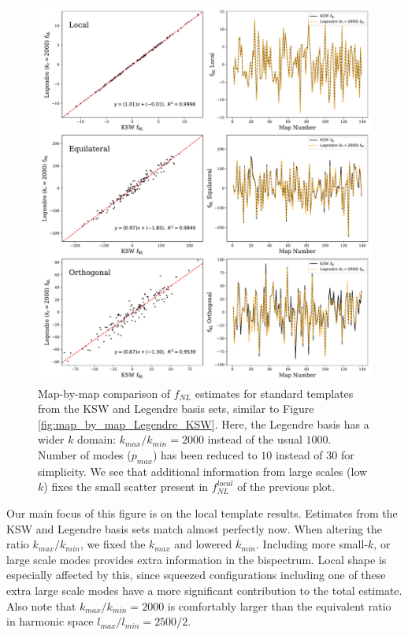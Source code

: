 \begin{figure}[htbp!] 
	\centering    
	\includegraphics[width=\textwidth]{map_by_map_Legendre_KSW_k_ratio_2000.pdf}
	\caption{Map-by-map comparison of $f_{NL}$ estimates for standard templates from the KSW and Legendre basis sets, similar to Figure \ref{fig:map_by_map_Legendre_KSW}. Here, the Legendre basis has a wider $k$ domain: $k_{max}/k_{min} = 2000$ instead of the usual $1000$. Number of modes ($p_{max}$) has been reduced to $10$ instead of $30$ for simplicity. We see that additional information from large scales (low $k$) fixes the small scatter present in $f_{NL}^{local}$ of the previous plot.}
	\label{fig:map_by_map_Legendre_KSW_k_ratio_2000}
\end{figure}

Our main focus of this figure is on the local template results. Estimates from the KSW and Legendre basis sets match almost perfectly now. When altering the ratio $k_{max}/k_{min}$, we fixed the $k_{max}$ and lowered $k_{min}$. Including more small-$k$, or large scale modes provides extra information in the bispectrum. Local shape is especially affected by this, since squeezed configurations including one of these extra large scale modes have a more significant contribution to the total estimate. Also note that $k_{max} / k_{min} = 2000$ is comfortably larger than the equivalent ratio in harmonic space $l_{max} / l_{min} = 2500 / 2$.

